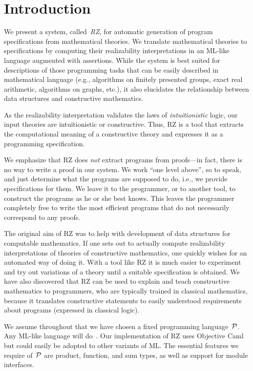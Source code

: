 \section{Introduction}
\label{sec:introduction}

We present a system, called~\emph{RZ}, for automatic generation of
program specifications from mathematical theories. We translate
mathematical theories to specifications by computing their
realizability interpretations in an ML-like language augmented with
assertions. While the system is best suited for descriptions of those
programming tasks that can be easily described in mathematical
language (e.g., algorithms on finitely presented groups, exact real
arithmetic, algorithms on graphs, etc.), it also elucidates the
relationship between data structures and constructive mathematics.

As the realizability interpretation validates the laws of
\emph{intuitionistic} logic, our input theories are intuitionistic or
constructive. Thus, RZ is a tool that extracts the computational
meaning of a constructive theory and expresses it as a programming
specification.

We emphasize that RZ does \emph{not} extract programs from proofs---in
fact, there is no way to write a proof in our system. We work ``one
level above'', so to speak, and just determine what the programs are
supposed to do, i.e., we provide specifications for them. We leave it
to the programmer, or to another tool, to construct the programs as he
or she best knows. This leaves the programmer completely free to write
the most efficient programs that do not necessarily correspond to any
proofs.

The original aim of RZ was to help with development of data structures
for computable mathematics. If one sets out to actually compute
realizability interpretations of theories of constructive mathematics,
one quickly wishes for an automated way of doing it. With a tool like
RZ it is much easier to experiment and try out variations of a theory
until a suitable specification is obtained. We have also discovered
that RZ can be used to explain and teach constructive mathematics to
programmers, who are typically trained in classical mathematics,
because it translates constructive statements to easily understood
requirements about programs (expressed in classical logic).

We assume throughout that we have chosen a fixed programming
language~$\mathcal{P}$. Any ML-like language will
do~\cite{milner+:definition}. Our implementation of RZ uses Objective
Caml~\cite{ocaml} but could easily be adopted to other variants of ML.
The essential features we require of~$\mathcal{P}$ are product, function, and
sum types, as well as support for module interfaces.

